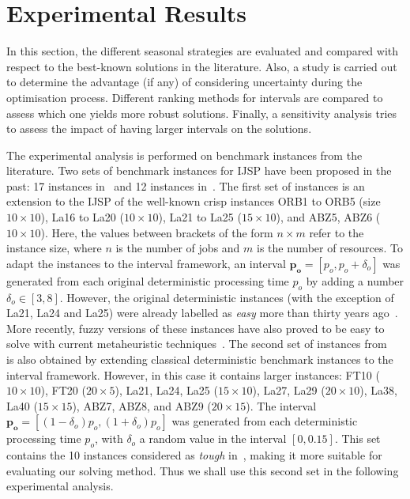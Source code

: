 \documentclass[icae]{iosart2x}
\newcommand{\reviewed}[1]{#1} %
\begin{document}
\section{Experimental Results}\label{secResults}

In this section, the different seasonal strategies are evaluated and compared with respect to the best-known solutions in the literature. Also, a study is carried out to determine the advantage (if any) of considering uncertainty during the optimisation process. Different ranking methods for intervals are compared to assess which one yields more robust solutions. Finally, a sensitivity analysis tries to assess the impact of having larger intervals on the solutions.

\reviewed{The experimental analysis is performed on benchmark instances from the literature. Two sets of benchmark instances for IJSP have been proposed in the past: 17 instances in~\cite{Lei2011} and 12 instances in~\cite{Diaz2020genetic}. The first set of instances is an extension to the IJSP of the well-known crisp instances ORB1 to ORB5 (size $10\times 10$), La16 to La20 ($10\times 10$), La21 to La25 ($15 \times 10$), and ABZ5, ABZ6 ($10 \times 10$). Here, the values between brackets of the form $n \times m$ refer to the instance size, where $n$ is the number of jobs and $m$ is the number of resources.  To adapt the instances to the interval framework,  an interval $\mathbf{p_o}=[p_o, p_o+\delta_o]$ was generated from each original deterministic processing time $p_o$ by adding a number $\delta_o \in [3,8]$. However, the original deterministic instances (with the exception of La21, La24 and La25) were already labelled as \textit{easy} more than thirty years ago~\cite{Applegate1991}. More recently, fuzzy versions of these instances have also proved to be easy to solve with current metaheuristic techniques~\cite{Palacios2016}. The second set of instances from ~\cite{Diaz2020genetic} is also obtained by extending classical deterministic benchmark instances to the interval framework. However, in this case it contains larger instances: FT10 ($10\times10$), FT20 ($20\times5$), La21, La24, La25 ($15\times10$), La27, La29 ($20\times10$), La38, La40 ($15\times15$), ABZ7, ABZ8, and ABZ9 ($20\times15$). The interval $\mathbf{p_o}=[(1-\delta_o)p_o, (1+\delta_o)p_o]$ was generated from each deterministic processing time $p_o$, with $\delta_o$ a random value in the interval $[0,0.15]$. This set contains the 10 instances considered as \textit{tough} in~\cite{Applegate1991}, making it more suitable for evaluating our solving method. Thus we shall use this second set in the following experimental analysis. }
\end{document}
